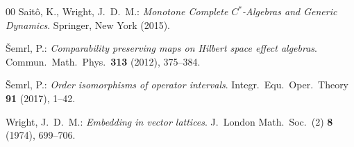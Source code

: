 \documentclass[12pt]{amsart}
\theoremstyle{definition}
\theoremstyle{remark}
\numberwithin{equation}{section}
\begin{document}
\begin{thebibliography}{00}
	Sait\^o, K., Wright, J.\ D.\ M.: \textit{Monotone Complete $C^{*}$-Algebras and Generic Dynamics}. Springer, New York (2015).
	
	\v{S}emrl, P.: \textit{Comparability preserving maps on Hilbert space effect algebras}. Commun.\ Math.\ Phys.\ \textbf{313} (2012), 375--384. 
	
	\v{S}emrl, P.: \textit{Order isomorphisms of operator intervals}. Integr.\ Equ.\ Oper.\ Theory \textbf{91} (2017), 1--42.
	
	Wright, J.\ D.\ M.: \textit{Embedding in vector lattices}. J.\ London Math.\ Soc.\ (2) \textbf{8} (1974), 699--706.
	
\end{thebibliography}
\end{document}
